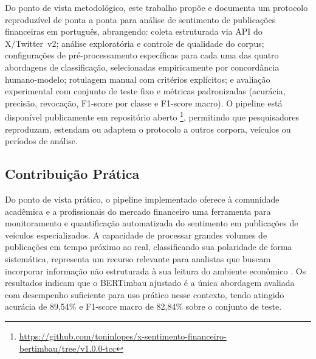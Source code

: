 Do ponto de vista metodológico, este trabalho propõe e documenta um protocolo reproduzível de ponta a ponta para análise de sentimento de publicações financeiras em português, abrangendo: coleta estruturada via API do X/Twitter~v2; análise exploratória e controle de qualidade do corpus; configurações de pré-processamento específicas para cada uma das quatro abordagens de classificação, selecionadas empiricamente por concordância humano-modelo; rotulagem manual com critérios explícitos; e avaliação experimental com conjunto de teste fixo e métricas padronizadas (acurácia, precisão, revocação, F1-score por classe e F1-score macro). O pipeline está disponível publicamente em repositório aberto \footnote{\url{https://github.com/toninlopes/x-sentimento-financeiro-bertimbau/tree/v1.0.0-tcc}}, permitindo que pesquisadores reproduzam, estendam ou adaptem o protocolo a outros corpora, veículos ou períodos de análise.


\subsection{Contribuição Prática}
\label{subsec:contrib_pratica}

Do ponto de vista prático, o pipeline implementado oferece à comunidade acadêmica e a profissionais do mercado financeiro uma ferramenta para monitoramento e quantificação automatizada do sentimento em publicações de veículos especializados. A capacidade de processar grandes volumes de publicações em tempo próximo ao real, classificando sua polaridade de forma sistemática, representa um recurso relevante para analistas que buscam incorporar informação não estruturada à sua leitura do ambiente econômico \cite{tetlock2007,kearney2014}. Os resultados indicam que o BERTimbau ajustado é a única abordagem avaliada com desempenho suficiente para uso prático nesse contexto, tendo atingido acurácia de 89,54\% e F1-score macro de 82,84\% sobre o conjunto de teste.